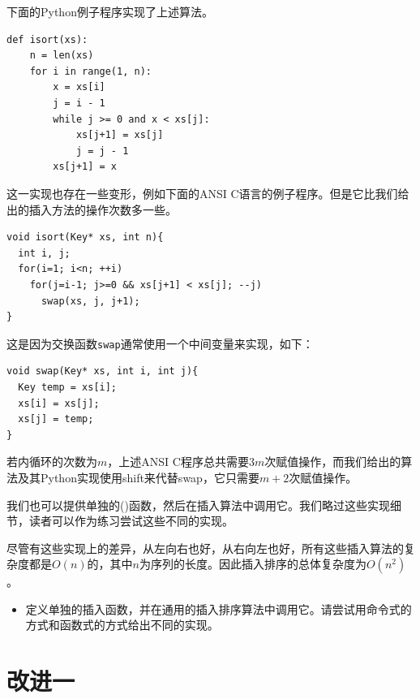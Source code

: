 \documentclass[UTF8]{article}
\begin{document}
下面的Python例子程序实现了上述算法。

\lstset{language=Python}
\begin{lstlisting}
def isort(xs):
    n = len(xs)
    for i in range(1, n):
        x = xs[i]
        j = i - 1
        while j >= 0 and x < xs[j]:
            xs[j+1] = xs[j]
            j = j - 1
        xs[j+1] = x
\end{lstlisting}

这一实现也存在一些变形，例如下面的ANSI C语言的例子程序。但是它比我们给出的插入方法的操作次数多一些。

\lstset{language=C}
\begin{lstlisting}
void isort(Key* xs, int n){
  int i, j;
  for(i=1; i<n; ++i)
    for(j=i-1; j>=0 && xs[j+1] < xs[j]; --j)
      swap(xs, j, j+1);
}
\end{lstlisting}

这是因为交换函数\texttt{swap}通常使用一个中间变量来实现，如下：

\begin{lstlisting}
void swap(Key* xs, int i, int j){
  Key temp = xs[i];
  xs[i] = xs[j];
  xs[j] = temp;
}
\end{lstlisting}

若内循环的次数为$m$，上述ANSI C程序总共需要$3m$次赋值操作，而我们给出的算法及其Python实现使用shift来代替swap，它只需要$m+2$次赋值操作。

我们也可以提供单独的()函数，然后在插入算法中调用它。我们略过这些实现细节，读者可以作为练习尝试这些不同的实现。

尽管有这些实现上的差异，从左向右也好，从右向左也好，所有这些插入算法的复杂度都是$O(n)$的，其中$n$为序列的长度。因此插入排序的总体复杂度为$O(n^2)$。

\begin{Exercise}

\begin{itemize}
\item 定义单独的插入函数，并在通用的插入排序算法中调用它。请尝试用命令式的方式和函数式的方式给出不同的实现。
\end{itemize}

\end{Exercise}


\section{改进一}
\end{document}
